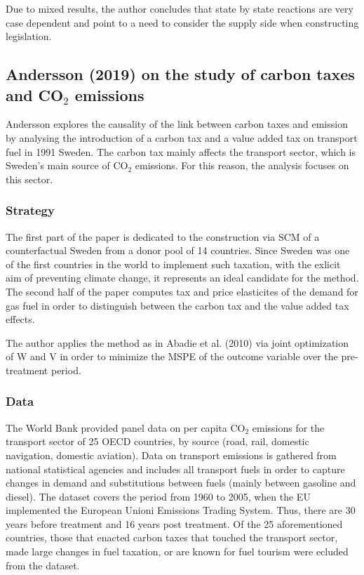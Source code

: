 \documentclass[12pt,a4paper,draft]{article}
\begin{document}
Due to mixed results, the author concludes that state by state reactions are very case 
dependent and point to a need to consider the supply side when constructing legislation.


\subsection{Andersson (2019) on the study of carbon taxes and CO$_2$ emissions}
Andersson explores the causality of the link between carbon taxes and emission by analysing 
the introduction of a carbon tax and a value added tax on transport fuel in 1991 Sweden. 
The carbon tax mainly affects the transport sector, which is Sweden's main source of 
CO$_2$ emissions. For this reason, the analysis focuses on this sector.

\subsubsection*{Strategy}
The first part of the paper is dedicated to the construction via SCM of a counterfactual 
Sweden from a donor pool of 14 countries. Since Sweden was one of the first countries 
in the world to implement such taxation, with the exlicit aim of preventing climate change, 
it represents an ideal candidate for the method.
The second half of the paper computes tax and price elasticites of the demand for gas fuel 
in order to distinguish between the carbon tax and the value added tax effects. 

The author applies the method as in Abadie et al. (2010) via joint optimization of W and V 
in order to minimize the MSPE of the outcome variable over the pre-treatment period.  


\subsubsection*{Data}
The World Bank provided panel data on per capita CO$_2$ emissions for the transport sector 
of 25 OECD countries, by source (road, rail, domestic navigation, domestic aviation). 
Data on transport emissions is gathered from national statistical agencies and includes 
all transport fuels in order to capture changes in demand and substitutions between fuels 
(mainly between gasoline and diesel). The dataset covers the period from 1960 to 2005, when 
the EU implemented the European Unioni Emissions Trading System. Thus, there are 30 years 
before treatment and 16 years post treatment.
Of the 25 aforementioned countries, those that enacted carbon taxes that touched the 
transport sector, made large changes in fuel taxation, or are known for fuel tourism were 
ecluded from the dataset.
\end{document}
